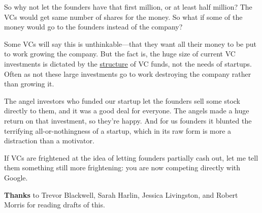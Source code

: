 So why not let the founders have
                  that first million, or at least half million? The VCs would
                  get same number of shares for the money. So what if some of
                  the money would go to the founders instead of the company?

Some
                  VCs will say this is unthinkable---that they want all
                  their money to be put to work growing the company. But the
                  fact is, the huge size of current VC investments is dictated
                  by the \href{http://www.paulgraham.com/venturecapital.html}{structure} of VC
                  funds, not the needs of startups. Often as not these large
                  investments go to work destroying the company rather than
                  growing it.

The angel investors who funded our
                  startup let the founders sell some stock directly to them, and
                  it was a good deal for everyone. The angels made a huge return
                  on that investment, so they're happy. And for us founders it
                  blunted the terrifying all-or-nothingness of a startup, which
                  in its raw form is more a distraction than a motivator.

If
                  VCs are frightened at the idea of letting founders partially
                  cash out, let me tell them something still more frightening:
                  you are now competing directly with Google.






                  \textbf{Thanks} to Trevor Blackwell, Sarah Harlin, Jessica
                  Livingston, and Robert Morris for reading drafts of this.


              
            
          
